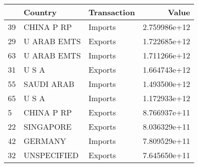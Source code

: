 \begin{tabular}{lllr}
\toprule
{} &      Country & Transaction &         Value \\
\midrule
39 &   CHINA P RP &     Imports &  2.759986e+12 \\
29 &  U ARAB EMTS &     Exports &  1.722685e+12 \\
63 &  U ARAB EMTS &     Imports &  1.711266e+12 \\
31 &        U S A &     Exports &  1.664743e+12 \\
55 &   SAUDI ARAB &     Imports &  1.493500e+12 \\
65 &        U S A &     Imports &  1.172933e+12 \\
5  &   CHINA P RP &     Exports &  8.766937e+11 \\
22 &    SINGAPORE &     Exports &  8.036329e+11 \\
42 &      GERMANY &     Imports &  7.809529e+11 \\
32 &  UNSPECIFIED &     Exports &  7.645650e+11 \\
\bottomrule
\end{tabular}

